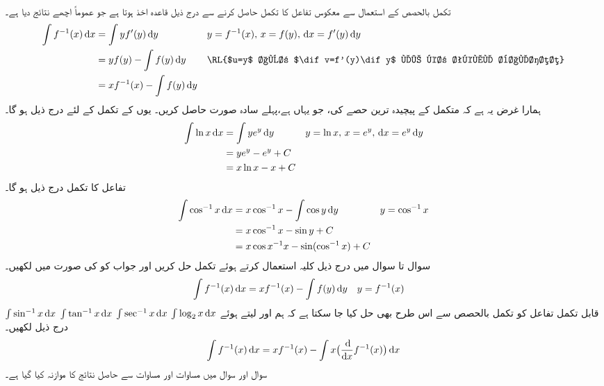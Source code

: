 \\
تکمل بالحصص کے استعمال سے  معکوس  تفاعل کا تکمل حاصل کرنے سے  درج ذیل  قاعدہ اخذ ہوتا ہے جو عموماً اچھے نتائج دیا ہے۔
\begin{align*}
\int f^{-1}(x)\dif x&=\int yf'(y)\dif y&&y=f^{-1}(x),\, x=f(y),\, \dif x=f'(y)\dif y\\
&=yf(y)-\int f(y)\dif y&&\text{\RL{$u=y$ اور $\dif v=f'(y)\dif y$ لے کر تکمل بالحصص}}\\
&=xf^{-1}(x)-\int f(y)\dif y
\end{align*} 
ہمارا   غرض  یہ ہے کہ متکمل کے پیچیدہ ترین حصے کی، جو یہاں  ہے،پہلے  سادہ صورت حاصل کریں۔ یوں   کے تکمل  کے لئے درج ذیل ہو گا۔
\begin{align*}
\int \ln x\dif x&=\int ye^y\dif y&&y=\ln x,\, x=e^y,\, \dif x=e^y\dif y\\
&=ye^y-e^y+C\\
&=x\ln x-x+C
\end{align*}
تفاعل  کا تکمل درج ذیل ہو گا۔
\begin{align*}
\int \cos^{-1}x\dif x&=x\cos^{-1}x-\int \cos y\dif y&&y=\cos^{-1}x\\
&=x\cos^{-1}x-\sin y+C\\
&=x\cos x^{-1}x-\sin(\cos^{-1}x)+C
\end{align*}
سوال  تا سوال  میں درج ذیل کلیہ    استعمال کرتے ہوئے تکمل حل کریں اور   جواب کو  کی صورت میں لکھیں۔
\begin{align}\label{مساوات_طریقہ_قاعدہ_الٹ_تفاعل_تکمل_الف}
\int f^{-1}(x)\dif x&=xf^{-1}(x)-\int f(y)\dif y&&y=f^{-1}(x)
\end{align}
$\int \sin^{-1}x\dif x$
$\int \tan^{-1}x\dif x$
$\int \sec^{-1}x\dif x$
$\int \log_2x\dif x$
قابل تکمل تفاعل  کو تکمل بالحصص سے  اس طرح  بھی حل کیا جا سکتا ہے کہ ہم   اور  لیتے ہوئے درج ذیل لکھیں۔
\begin{align}\label{مساوات_طریقہ_قاعدہ_الٹ_تفاعل_تکمل_ب}
\int f^{-1}(x)\dif x=xf^{-1}(x)-\int x\big(\frac{\dif}{\dif x}f^{-1}(x)\big)\dif x
\end{align}
سوال اور سوال  میں مساوات  اور مساوات   سے حاصل نتائج کا موازنہ کیا گیا ہے۔

